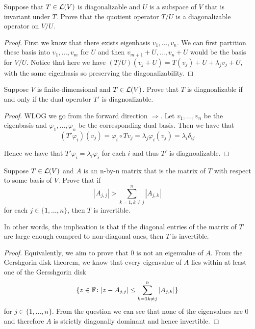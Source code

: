 \documentclass{extarticle}
\begin{document}
\begin{problem}{18}
    Suppose that \(T \in \mathcal{L}(V)\) is diagonalizable and \(U\) is a subspace of \(V\) that is invariant under 
    \(T\). Prove that the quotient operator \(T/U\) is a diagonalizable operator on \(V/U\). 
\end{problem}

\begin{proof}
First we know that there exists eigenbasis \(v_1, \ldots, v_n\). We can first partition these basis into 
\(v_1, \ldots, v_m\) for \(U\) and then \(v_{m+1} + U, \ldots, v_n + U\) would be the basis for 
\(V/U\). Notice that here we have \((T/U)(v_j + U) = T(v_j) + U + \lambda_j v_j + U\), with the same eigenbasis 
so preserving the diagonalizability.
\end{proof}


\begin{problem}{20}
    Suppose \(V\) is finite-dimensional and \(T \in \mathcal{L}(V)\). Prove that \(T\) is diagnoalizable if 
    and only if the dual operator \(T'\) is diagnoalizable. 
\end{problem}

\begin{proof}
WLOG we go from the forward direction \(\Rightarrow\). Let \(v_1, \ldots, v_n\) be the eigenbasis and 
\(\varphi_1, \ldots, \varphi_n\) be the corresponding dual basis. Then we have that 
\[(T' \varphi_i)(v_j) = \varphi_i \circ Tv_j = \lambda_j \varphi_i(v_j) = \lambda_i \delta_{ij}\]

Hence we have that \(T' \varphi_i = \lambda_i \varphi_i\) for each \(i\) and thus \(T'\) is diagnoalizable.

\end{proof}


\begin{problem}{22}
    Suppose \(T \in \mathcal{L}(V)\) and \(A\) is an n-by-n matrix that is the matrix of \(T\) with respect to some 
    basis of \(V\). Prove that if 
    \[|A_{j,j}| > \sum_{k=1, k\neq j}^{n} |A_{j,k}|\] 
    for each \(j \in \{1, \ldots, n\}\), then \(T\) is invertible. 

    In other words, the implication is that if the diagonal entries of the matrix of \(T\) are large enough 
    compred to non-diagonal ones, then \(T\) is invertible. 
\end{problem}

\begin{proof}
Equivalently, we aim to prove that 0 is not an eigenvalue of \(A\). From the Gershgorin disk theorem, we know 
that every eigenvalue of \(A\) lies within at least one of the Gersshgorin disk 
\[\{z \in \mathbb{F} \colon |z - A_{j,j}| \leq \sum_{k=1 k \neq j }^{n} |A_{j,k}|\}\]
for \(j \in \{1, \ldots, n\}\). From the question we can see that none of the eigenvalues are 0 and therefore 
\(A\) is strictly diagonally dominant and hence invertible. 

\end{proof}
\end{document}
